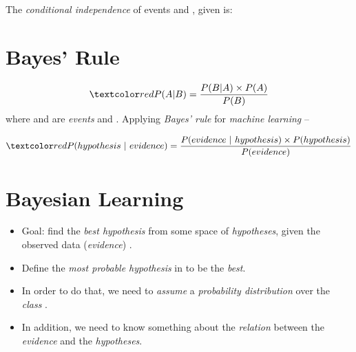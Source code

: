 \documentclass[
	number={3},
	title={Na\"iive Bayes Learning}
]{cs584notes}
\begin{document}

The \emph{conditional independence} of events  and , given  is:

\section{Bayes' Rule}\label{sec:bayes'-rule}
\begin{equation}
	\data{P(A|B) = \frac{P(B|A)\times P(A)}{P(B)}}
	\label{eq:bayes-rule}
\end{equation}
where  and  are \emph{events} and .
Applying \emph{Bayes' rule} for \emph{machine learning} --

\begin{equation}
	\data{P(hypothesis\ |\ evidence) = \frac{P(evidence\ |\ hypothesis)\times P(hypothesis)}{P(evidence)}}
	\label{eq:bayes-rule-ml}
\end{equation}

\section{Bayesian Learning}\label{sec:bayesian-learning}
\begin{itemize}
	\item Goal: find the \emph{best hypothesis} from some space  of \emph{hypotheses}, given the observed data (\emph{evidence}) .
	\item Define the \emph{most probable hypothesis} in  to be the \emph{best}.
	\item In order to do that, we need to \emph{assume} a \emph{probability distribution} over the \emph{class} .
	\item In addition, we need to know something about the \emph{relation} between the \emph{evidence} and the \emph{hypotheses}.
\end{itemize}
\end{document}
